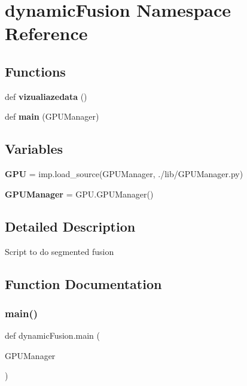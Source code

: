 \section{dynamic\+Fusion Namespace Reference}
\label{namespacedynamic_fusion}
\subsection*{Functions}
\begin{DoxyCompactItemize}
\item 
def \textbf{ vizualiazedata} ()
\item 
def \textbf{ main} (G\+P\+U\+Manager)
\end{DoxyCompactItemize}
\subsection*{Variables}
\begin{DoxyCompactItemize}
\item 
\mbox{\label{namespacedynamic_fusion_a330708383ddc6854d2f4594339bf2eb9}} 
{\bfseries G\+PU} = imp.\+load\+\_\+source(\textquotesingle{}G\+P\+U\+Manager\textquotesingle{}, \textquotesingle{}./lib/G\+P\+U\+Manager.\+py\textquotesingle{})
\item 
\mbox{\label{namespacedynamic_fusion_a419f0f77f73819562fdfabdbd6bb2469}} 
{\bfseries G\+P\+U\+Manager} = G\+P\+U.\+G\+P\+U\+Manager()
\end{DoxyCompactItemize}


\subsection{Detailed Description}
\begin{DoxyVerb}Script to do segmented fusion\end{DoxyVerb}
 

\subsection{Function Documentation}
\mbox{\label{namespacedynamic_fusion_a6ead22a2201158e6101fd1b1e89f3c27}} 
\subsubsection{main()}
{\footnotesize\ttfamily def dynamic\+Fusion.\+main (\begin{DoxyParamCaption}\item[{}]{G\+P\+U\+Manager }\end{DoxyParamCaption})}

